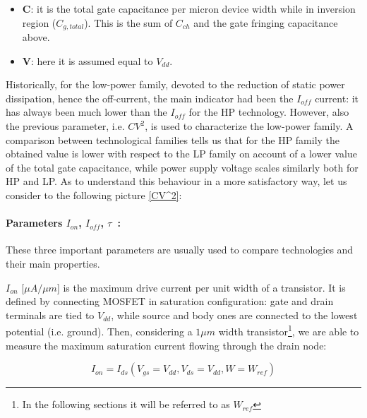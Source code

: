 \documentclass[a4paper, 12pt, twoside, openright]{report}
\begin{document}
\begin{itemize}
\item \textbf{C}: it is the total gate capacitance per micron device width while in inversion region ($C_{g,total}$). This is the sum of $C_{ch}$ and the gate fringing capacitance above.
\item \textbf{V}: here it is assumed equal to $V_{dd}$.
\end{itemize}

Historically, for the low-power family, devoted to the reduction of static power dissipation, hence the off-current, the main indicator had been the $I_{off}$ current: it has always been much lower than the $I_{off}$ for the HP technology. However, also the previous parameter, i.e. $CV^{2}$, is used to characterize the low-power family. A comparison between technological families tells us that for the HP family the obtained value is lower with respect to the LP family on account of a lower value of the total gate capacitance, while power supply voltage scales similarly both for HP and LP. As to understand this behaviour in a more satisfactory way, let us consider to the following picture \ref{CV^2}:



\paragraph{Parameters $I_{on}$, $I_{off}$, $\tau$~:} These three important parameters are usually used to compare technologies and their main properties.

$I_{on}$ [$\mu A/\mu m$] is the maximum drive current per unit width of a transistor. It is defined by connecting MOSFET in saturation configuration: gate and drain terminals are tied to $V_{dd}$, while source and body ones are connected to the lowest potential (i.e. ground). Then, considering a $1 \mu m$ width transistor\footnote{In the following sections it will be referred to as $W_{ref}$}, we are able to measure the maximum saturation current flowing through the drain node:

\begin{equation}
I_{on} = I_{ds}(V_{gs}=V_{dd}, V_{ds}=V_{dd}, W=W_{ref})
\label{}
\end{equation} 
\end{document}
